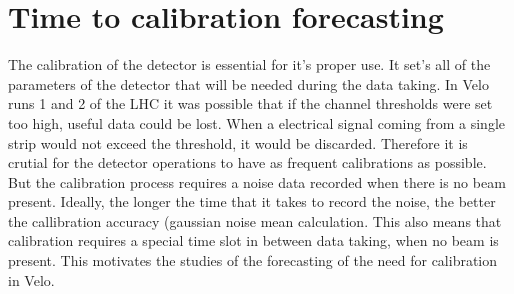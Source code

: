 \section{Time to calibration forecasting}
\label{chap4:wtte}
The calibration of the detector is essential for it's proper use. It set's all of the parameters of the detector that will be needed during the data taking.
In Velo runs 1 and 2 of the LHC it was possible that if the channel thresholds were set too high, useful data could be lost. When a electrical signal coming from a single strip would not exceed the threshold, it would be discarded.
Therefore it is crutial for the detector operations to have as frequent calibrations as possible.
But the calibration process requires a noise data recorded when there is no beam present. Ideally, the longer the time that it takes to record the noise, the better the callibration accuracy (gaussian noise mean calculation. This also means that calibration requires a special time slot in between data taking, when no beam is present.
This motivates the studies of the forecasting of the need for calibration in Velo.

